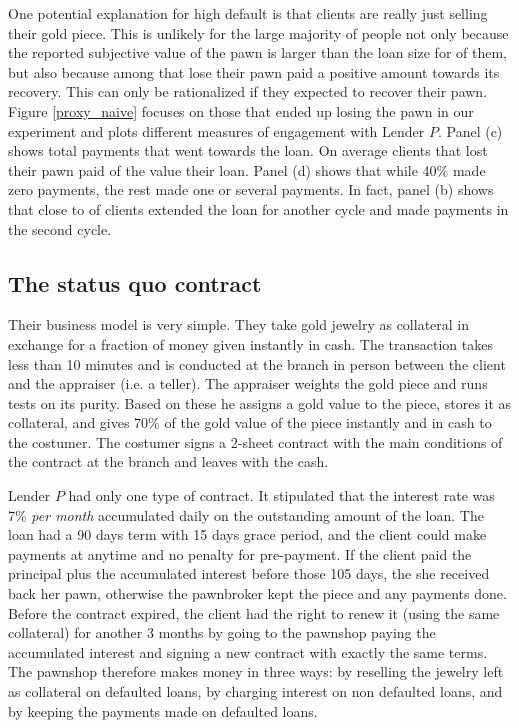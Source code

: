 \documentclass[11pt]{article}
\begin{document}
One potential explanation for high default is that clients are really just selling their gold piece. This is unlikely for the large majority of people not only because the reported subjective value of the pawn is larger than the loan size for  of them, but also because among that lose their pawn  paid a positive amount towards its recovery. This can only be rationalized if they expected to recover their pawn.  Figure \ref{proxy_naive} focuses on those that ended up losing the pawn in our experiment and plots different measures of engagement with Lender $P$. Panel (c) shows total payments that went towards the loan. On average clients that lost their pawn paid  of the value their loan. Panel (d) shows that while 40\% made zero payments, the rest made one or several payments. In fact, panel (b) shows that close to  of clients extended the loan for another cycle and made payments in the second cycle. 


\subsection{The status quo contract}

Their business model is very simple. They take gold jewelry as collateral in exchange for a fraction of money given instantly in cash. The transaction takes less than 10 minutes and is conducted at the branch in person between the client and the appraiser (i.e. a teller). The appraiser weights the gold piece and runs tests on its purity. Based on these he assigns a gold value to the piece, stores it as collateral, and gives 70\% of the gold value of the piece instantly and in cash to the costumer. The costumer signs a 2-sheet contract with the main conditions of the contract at the branch and leaves with the cash.

Lender $P$ had only one type of contract. It stipulated that the interest rate was 7\% \textit{per month} accumulated daily on the outstanding amount of the loan. The loan had a 90 days term with 15 days grace period, and the client could make payments at anytime and no penalty for pre-payment. If the client paid the principal plus the accumulated interest before those 105 days, the she received back her pawn, otherwise the pawnbroker kept the piece and any payments done. Before the contract expired, the client had the right to renew it (using the same collateral) for another 3 months by going to the pawnshop paying the accumulated interest and signing a new contract with exactly the same terms. The pawnshop therefore makes money in three ways: by reselling the jewelry left as collateral on defaulted loans, by charging interest on non defaulted loans, and by keeping the payments made on defaulted loans. 
\end{document}
